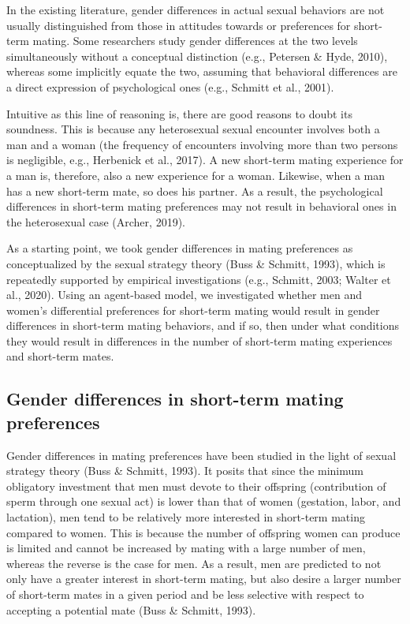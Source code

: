 \documentclass[
  11pt,
]{article}
\begin{document}
In the existing literature, gender differences in actual sexual
behaviors are not usually distinguished from those in attitudes towards
or preferences for short-term mating. Some researchers study gender
differences at the two levels simultaneously without a conceptual
distinction (e.g., Petersen \& Hyde, 2010), whereas some implicitly
equate the two, assuming that behavioral differences are a direct
expression of psychological ones (e.g., Schmitt et al., 2001).

Intuitive as this line of reasoning is, there are good reasons to doubt
its soundness. This is because any heterosexual sexual encounter
involves both a man and a woman (the frequency of encounters involving
more than two persons is negligible, e.g., Herbenick et al., 2017). A
new short-term mating experience for a man is, therefore, also a new
experience for a woman. Likewise, when a man has a new short-term mate,
so does his partner. As a result, the psychological differences in
short-term mating preferences may not result in behavioral ones in the
heterosexual case (Archer, 2019).

As a starting point, we took gender differences in mating preferences as
conceptualized by the sexual strategy theory (Buss \& Schmitt, 1993),
which is repeatedly supported by empirical investigations (e.g.,
Schmitt, 2003; Walter et al., 2020). Using an agent-based model, we
investigated whether men and women's differential preferences for
short-term mating would result in gender differences in short-term
mating behaviors, and if so, then under what conditions they would
result in differences in the number of short-term mating experiences and
short-term mates.

\hypertarget{gender-differences-in-short-term-mating-preferences}{%
\subsection{Gender differences in short-term mating
preferences}\label{gender-differences-in-short-term-mating-preferences}}

Gender differences in mating preferences have been studied in the light
of sexual strategy theory (Buss \& Schmitt, 1993). It posits that since
the minimum obligatory investment that men must devote to their
offspring (contribution of sperm through one sexual act) is lower than
that of women (gestation, labor, and lactation), men tend to be
relatively more interested in short-term mating compared to women. This
is because the number of offspring women can produce is limited and
cannot be increased by mating with a large number of men, whereas the
reverse is the case for men. As a result, men are predicted to not only
have a greater interest in short-term mating, but also desire a larger
number of short-term mates in a given period and be less selective with
respect to accepting a potential mate (Buss \& Schmitt, 1993).
\end{document}
